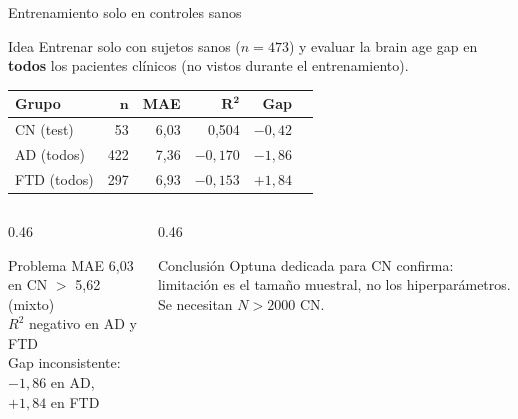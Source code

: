 \documentclass[aspectratio=169, 11pt]{beamer}
\begin{document}
\begin{frame}{Entrenamiento solo en controles sanos}
  \begin{block}{Idea}
    Entrenar solo con sujetos sanos ($n = 473$) y evaluar la brain age gap en \textbf{todos} los pacientes clínicos (no vistos durante el entrenamiento).
  \end{block}

  \vspace{0.3cm}
  \centering
  {\small
  \begin{tabular}{lrrrrr}
    \toprule
    \textbf{Grupo} & $\boldsymbol{n}$ & \textbf{MAE} & $\boldsymbol{R^2}$ & \textbf{Gap} \\
    \midrule
    CN (test)   & 53  & 6,03 & 0,504    & $-0{,}42$ \\
    AD (todos)  & 422 & 7,36 & $-0,170$ & $-1{,}86$ \\
    FTD (todos) & 297 & 6,93 & $-0,153$ & $+1{,}84$ \\
    \bottomrule
  \end{tabular}}

  \vspace{0.3cm}
  \begin{columns}[T]
    \begin{column}{0.46\textwidth}
      \begin{alertblock}{Problema}
        {\small MAE 6,03 en CN $>$ 5,62 (mixto)\\
        $R^2$ negativo en AD y FTD\\
        Gap inconsistente: $-1{,}86$ en AD, $+1{,}84$ en FTD}
      \end{alertblock}
    \end{column}
    \begin{column}{0.46\textwidth}
      \begin{block}{Conclusión}
        {\small Optuna dedicada para CN confirma: limitación es el tamaño muestral, no los hiperparámetros. Se necesitan $N > 2000$ CN.}
      \end{block}
    \end{column}
  \end{columns}
\end{frame}
\end{document}
